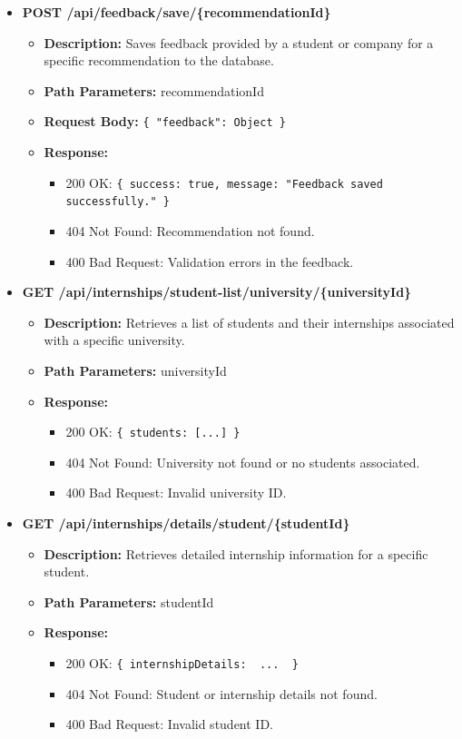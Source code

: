 \begin{itemize}
    \item \textbf{POST /api/feedback/save/\{recommendationId\}}  
    \begin{itemize}
        \item \textbf{Description:} Saves feedback provided by a student or company for a specific recommendation to the database.
        \item \textbf{Path Parameters:} recommendationId  
        \item \textbf{Request Body:} 
        \texttt{\{ 
            "feedback": Object
        \}}
        \item \textbf{Response:}
        \begin{itemize}
            \item 200 OK: \texttt{\{ success: true, message: "Feedback saved successfully." \}}
            \item 404 Not Found: Recommendation not found.
            \item 400 Bad Request: Validation errors in the feedback.
        \end{itemize}
    \end{itemize}

    \item \textbf{GET /api/internships/student-list/university/\{universityId\}}  
    \begin{itemize}
        \item \textbf{Description:} Retrieves a list of students and their internships associated with a specific university.
        \item \textbf{Path Parameters:} universityId  
        \item \textbf{Response:}
        \begin{itemize}
            \item 200 OK: \texttt{\{ students: [...] \}}
            \item 404 Not Found: University not found or no students associated.
            \item 400 Bad Request: Invalid university ID.
        \end{itemize}
    \end{itemize}

    \item \textbf{GET /api/internships/details/student/\{studentId\}}  
    \begin{itemize}
        \item \textbf{Description:} Retrieves detailed internship information for a specific student.
        \item \textbf{Path Parameters:} studentId  
        \item \textbf{Response:}
        \begin{itemize}
            \item 200 OK: \texttt{\{ internshipDetails: { ... } \}}
            \item 404 Not Found: Student or internship details not found.
            \item 400 Bad Request: Invalid student ID.
        \end{itemize}
    \end{itemize}


\end{itemize}
